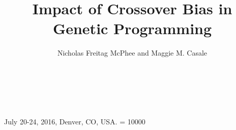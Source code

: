 \documentclass{sig-alternate}
\begin{document}
 {July 20-24, 2016, Denver, CO, USA.}
\widowpenalty = 10000
    
\title{Impact of Crossover Bias in Genetic Programming}

\author{
\alignauthor
Nicholas Freitag McPhee and Maggie M. Casale\\
	\\
	\\
	\\
}



\maketitle
\end{document}
